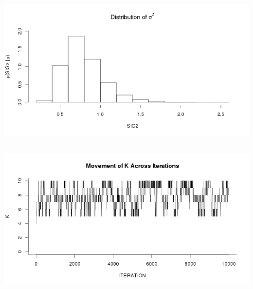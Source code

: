 \documentclass[12pt,letterpaper]{article}\usepackage[]{graphicx}\usepackage[]{color}
\begin{document}
\begin{center}
\includegraphics[height=8cm, keepaspectratio]{distribution-sig2.png}\\
\includegraphics[height=8cm, keepaspectratio]{K-vs-iterations.png}\\
\end{center}
\end{document}
